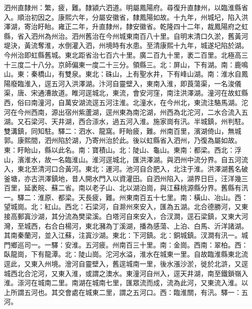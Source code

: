 \begin{pinyinscope}
泗州直隸州：繁，疲，難。隸潁六泗道。明屬鳳陽府。尋復升直隸州，以臨淮縣省入。順治初因之。康熙六年，分屬安徽省，隸鳳陽如故。十九年，州城圮，陷入洪澤湖，寄治盱眙。雍正二年，升直隸州，隸安徽省。乾隆四十二年，裁鳳陽府之虹縣，省入泗州為州治。泗州舊治在今州城東南百八十里。自明末清口久淤，舊黃河堤決，黃流奪淮，水倒灌入泗，州境時有水患。至清康熙十九年，城遂圮陷於湖。今州治即虹縣舊城。東北距省治七百六十里。廣二百九十里，袤二百里。北極高三十三度二十八分。京師偏東一度二十三分。領縣三。北：屏山，下有湖。南：鹿鳴山。東：秦橋山，有雙泉。東北：硃山，上有聖水井，下有峰山湖。南：淮水自鳳陽廢臨淮入，逕五河入洪澤湖。汴河自靈壁入，東南入淮，即莨蕩渠，一名浚儀渠，唐、宋通漕故道。睢河逕城北，東流，會安河窪，南注洪澤湖。潼河在故虹縣西，俗曰南潼河，自萬安湖流逕五河注淮。北潼水，在今州北，東流注駱馬湖。沱河在今州西南，源出宿州紫蘆湖，逕州東為南沱湖，州西為北沱河，二水合流入五湖。又石梁河、天井湖，西合漴水，過五河入淮。施家崗有汛。半城鎮，州判駐。雙溝鎮，同知駐。驛二：泗水、龍窩。盱眙疲，難。州南百里，濱湖倚山，無城郭。康熙間，泗州陷於湖，乃寄州治於此。後以虹縣省入泗州，乃復為屬如故。東：盱眙山，縣以此名。南：寶積山。北：陡山、龜山。東南：都梁。西北：浮山，濱淮水，故一名臨淮山。淮河逕城北，匯洪澤湖。與泗州中流分界。自五河流入，東北至清河口合黃河。東北：運河。池河自合肥入，北注于淮。洪澤湖舊名破釜塘，亦古洪澤鎮地，昔人開水門入以資灌田。自泗州陷入，湖界日巨，汪洋幾三百里，延袤皖、蘇二省。南以老子山、北以湖泊崗，與江蘇桃源縣分界。舊縣有汛一。驛二：淮原、都梁。天長疲，難。州東南百五十七里。南：橫山、冶山。西：望城崗。北：紅山。西北：石梁河，自滁州來安入，匯為五湖。北合德勝河，又東接高郵寘沙湖，其分流為樊梁溪。白塔河自來安入，合汊澗，逕石梁鎮，又東大河灣，至城西，右合白楊河，東北瀦為丁溪湖，播為感蕩、上泊、白馬、沂洋諸湖。其南秦蘭河，並入江蘇，注寘沙湖。東北：下河鎮。北：銅城鎮。汊澗有汛一。城門鄉巡司一。一驛：安淮。五河疲。州南百三十里。南：金崗。西南：翠柏。西：臥龍崗，下有龍潭。北：陡山崗。沱河水溢，淮水在城東一里。自故臨淮縣東北流逕此，又東入州境。澮河自靈壁入，舊逕城南一里，後水漲沙淤，徙於北滸，又逕城西北合沱河，又東入淮，或謂之澳水。東潼河自州入，逕天井湖，南至鐵鎖嶺入淮。漴河在城南二里。南湖在城南七里，匯眾流而成，流為此河，又東流入淮。以上所謂五河也。其交會處在城東二里，謂之五河口。西：臨淮關，有汛。驛一：五河。


\end{pinyinscope}